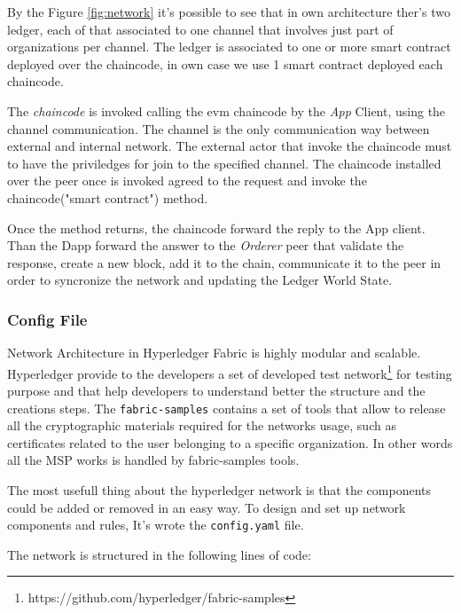 By the Figure \ref{fig:network} it's possible to see that in own architecture ther's two ledger, each of that associated
to one channel that involves just part of organizations per channel. The ledger is associated to one or more smart contract 
deployed over the chaincode, in own case we use 1 smart contract deployed each chaincode. 

The \textit{chaincode} is invoked calling the evm chaincode by the \textit{App} Client, using the channel communication.
The channel is the only communication way between external and internal network. The external actor that invoke the chaincode
must to have the priviledges for join to the specified channel. 
The chaincode installed over the peer once is invoked agreed to the request and invoke the chaincode("smart contract")
method. 

Once the method returns, the chaincode forward the reply to the App client. Than the Dapp forward the
answer to the \textit{Orderer} peer that validate the response, create a new block, add it to the chain,
communicate it to the peer in order to syncronize the network and updating the Ledger World State.

\subsubsection{Config File}

Network Architecture in Hyperledger Fabric is highly modular and scalable. Hyperledger provide to the developers a set of developed 
test network\footnote{https://github.com/hyperledger/fabric-samples} for testing purpose and that help developers to understand better 
the structure and the creations steps. The \texttt{fabric-samples} contains a set of tools that allow to release all the cryptographic
materials required for the networks usage, such as certificates related to the user belonging to a specific organization.
In other words all the MSP works is handled by fabric-samples tools. 
\bigskip

The most usefull thing about the hyperledger network is that the components could be added or removed in an easy way.
To design and set up network components and rules, It's wrote the \texttt{config.yaml} file.

\bigskip
The network is structured in the following lines of code:

